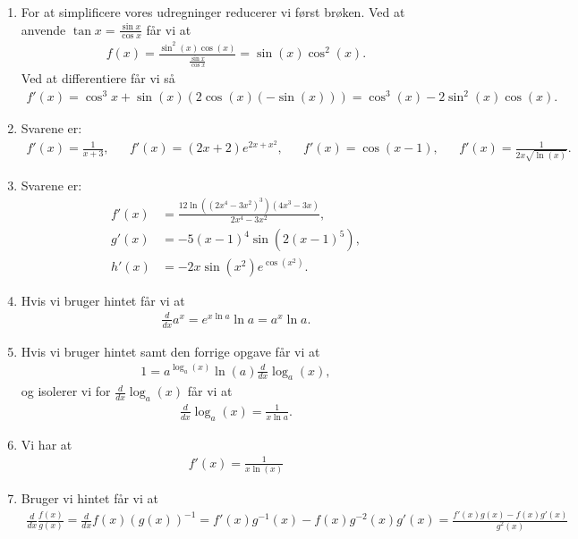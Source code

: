 \begin{enumerate}
	\item For at simplificere vores udregninger reducerer vi først brøken. Ved at anvende $\tan x=\frac{\sin x}{\cos x}$ får vi at
	\begin{align*}
	f(x)=\frac{\sin^2(x)\cos(x)}{\frac{\sin x}{\cos x}}=\sin(x)\cos^2(x).
	\end{align*}
	Ved at differentiere får vi så
	\begin{align*}
	f'(x)=\cos^3x+\sin(x)(2\cos(x)(-\sin(x)))=\cos^3(x)-2\sin^2(x)\cos(x).
	\end{align*}
	
	\item Svarene er:
	\begin{align*}
	f'(x)=\frac{1}{x+3},&& f'(x)=(2x+2)e^{2x+x^2},&& f'(x)=\cos(x-1),&&f'(x)=\frac{1}{2x\sqrt{\ln(x)}}.
	\end{align*}
	

	
	\item Svarene er:
	\begin{align*}
	f'(x)&=\frac{12\ln((2x^4-3x^2)^3)(4x^3-3x)}{2x^4-3x^2},\\
	g'(x)&=-5(x-1)^4\sin(2(x-1)^5),\\
	h'(x)&=-2x\sin(x^2)e^{\cos(x^2)}.
	\end{align*}
	
	\item \label{it:diff31ans} Hvis vi bruger hintet får vi at
	\begin{align*}
	\frac{d}{dx} a^x= e^{x\ln a} \ln a=a^x\ln a.
	\end{align*}

	\item Hvis vi bruger hintet samt den forrige opgave får vi at
	\begin{align*}
	1=a^{\log_a(x)}\ln(a) \frac{d}{dx}\log_a(x),
	\end{align*}
	og isolerer vi for $\frac{d}{dx} \log_a(x)$ får vi at
	\begin{align*}
	\frac{d}{dx} \log_a(x)=\frac{1}{x\ln a}.
	\end{align*}
	
	\item Vi har at
	\begin{align*}
	f'(x)=\frac{1}{x\ln(x)}
	\end{align*}
	
	\item Bruger vi hintet får vi at
	\begin{align*}
	\frac{d}{dx}\frac{f(x)}{g(x)}=\frac{d}{dx}f(x)(g(x))^{-1}=f'(x)g^{-1}(x)-f(x)g^{-2}(x)g'(x)=\frac{f'(x)g(x)-f(x)g'(x)}{g^2(x)}
	\end{align*}
	

\end{enumerate}
